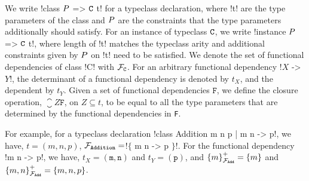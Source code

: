 \documentclass[format=acmsmall,manuscript,screen,nonacm,margin=1in,11pt]{acmart}
\begin{document}

We write !class $P$ => $\texttt{C}$ t! for a typeclass declaration,
where !t! are the type parameters of the class and $P$
are the constraints that the type parameters additionally should satisfy.
For an instance of typeclass $\texttt{C}$, we write !instance $P$ => $\texttt{C}$ t!,
where length of !t! matches the typeclass arity and additional constraints given by $P$ on !t!
need to be satisfied. We denote the set of functional dependencies of class !C! with $\mathcal{F}_\texttt{C}$.
For an arbitrary functional dependency !$X$ -> $Y$!, the determinant of a functional dependency
is denoted by $t_{X}$, and the dependent by $t_{Y}$.
Given a set of functional dependencies $\texttt{F}$, we define the closure operation,
$\closure Z {\texttt{F}}$, on $Z \subseteq t$, to be equal to all the type parameters
that are determined by the functional dependencies in \texttt{F}.

For example, for a typeclass declaration !class Addition m n p | m n -> p!,
we have, $t = (m, n, p)$, $\mathcal{F}_\texttt{Addition}=$!$\{$ m n -> p $\}$!.
For the functional dependency !m n -> p!, we have, $t_X = {(\texttt{m},\texttt{n})}$ and $t_Y = {(\texttt{p})}$,
and ${\{m\}}^{+}_{\mathcal{F}_\texttt{Add}} = \{m\}$ and ${\{m, n\}}^{+}_{\mathcal{F}_\texttt{Add}} = \{m, n, p\}$.
\end{document}
